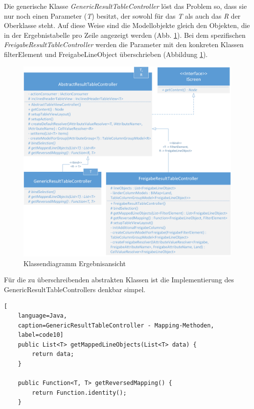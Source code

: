 Die generische Klasse \textit{GenericResultTableController} löst das Problem so, dass sie nur noch einen Parameter (\textit{T}) besitzt, der sowohl für das \textit{T} als auch das \textit{R} der Oberklasse steht. Auf diese Weise sind die Modellobjekte gleich den Objekten, die in der Ergebnistabelle pro Zeile angezeigt werden (Abb. \ref{fig:tabelle4}). Bei dem spezifischen \textit{FreigabeResultTableController} werden die Parameter mit den konkreten Klassen \gls{filterElement} und FreigabeLineObject überschrieben (Abbildung \ref{fig:tabelle4}).

\begin{figure}[H]
 \centering
 \includegraphics[width=1.0\textwidth]{grafiken/Class_ResultTable.png}
 \caption{Klassendiagramm Ergebnisansicht}
 \label{fig:tabelle4}
\end{figure}

Für die zu überschreibenden abstrakten Klassen ist die Implementierung des GenericResultTableControllers denkbar simpel.


\begin{lstlisting}[
    language=Java,
    caption=GenericResultTableController - Mapping-Methoden,
    label=code10]
	public List<T> getMappedLineObjects(List<T> data) {
		return data;
	}

	public Function<T, T> getReversedMapping() {
		return Function.identity();
	}
\end{lstlisting}

